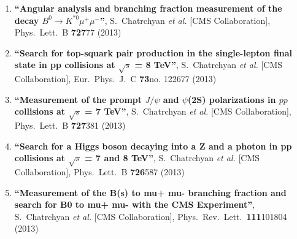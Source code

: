 \begin{enumerate}
\item%
{\bf ``Angular analysis and branching fraction measurement of the decay $B^0 \to K^{*0} \mu^+\mu^-$''}, 
  S.~Chatrchyan {\it et al.}  [CMS Collaboration], 
Phys.\ Lett.\ B {\bf 727}77 (2013) %


\item%
{\bf ``Search for top-squark pair production in the single-lepton final state in pp collisions at $\sqrt{s}$ = 8 TeV''}, 
  S.~Chatrchyan {\it et al.}  [CMS Collaboration], 
Eur.\ Phys.\ J.\ C {\bf 73}no. 122677 (2013) %


\item%
{\bf ``Measurement of the prompt $J/\psi$ and $\psi$(2S) polarizations in $pp$ collisions at $\sqrt{s}$ = 7 TeV''}, 
  S.~Chatrchyan {\it et al.}  [CMS Collaboration], 
Phys.\ Lett.\ B {\bf 727}381 (2013) %


\item%
{\bf ``Search for a Higgs boson decaying into a Z and a photon in pp collisions at $\sqrt{s}$ = 7 and 8 TeV''}, 
  S.~Chatrchyan {\it et al.}  [CMS Collaboration], 
Phys.\ Lett.\ B {\bf 726}587 (2013) %


\item%
{\bf ``Measurement of the B(s) to mu+ mu- branching fraction and search for B0 to mu+ mu- with the CMS Experiment''}, 
  S.~Chatrchyan {\it et al.}  [CMS Collaboration], 
Phys.\ Rev.\ Lett.\  {\bf 111}101804 (2013) %



\end{enumerate}
